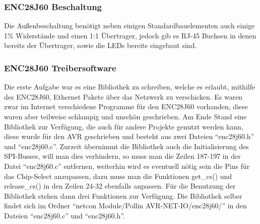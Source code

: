\documentclass[a4paper,14pt,headsepline]{scrartcl}
\begin{document}
\subsubsection{ENC28J60 Beschaltung}
Die Außenbeschaltung benötigt neben einigen Standardbauelementen auch einige 1\% Widerstände und einen 1:1 Übertrager, jedoch gib es RJ-45 Buchsen in denen bereits der Übertrager, sowie die LEDs bereits eingebaut sind.
\begin{figure}[h]
\begin{center}
\end{center}
\end{figure}

\newpage

\subsubsection{ENC28J60 Treibersoftware}
Die erste Aufgabe war es eine Bibliothek zu schreiben, welche es erlaubt, mithilfe des ENC28J60, Ethernet Pakete über das Netzwerk zu verschicken. Es waren zwar im Internet verschiedene Programme für den ENC28J60 vorhanden, diese waren aber teilweise schlampig und unschön geschrieben. Am Ende Stand eine Bibliothek zur Verfügung, die auch für andere Projekte genutzt werden kann, diese wurde für den AVR geschrieben und besteht aus zwei Dateien "`enc28j60.h"' und "`enc28j60.c"'. Zurzeit übernimmt die Bibliothek auch die Initialisierung des SPI-Busses, will man dies verhindern, so muss man die Zeilen 187-197 in der Datei "`enc28j60.c"' entfernen, weiterhin wird es eventuell nötig sein die  Pins für das Chip-Select anzupassen, dazu muss man die Funktionen get\_cs() und release\_cs() in den Zeilen 24-32 ebenfalls anpassen. Für die Benutzung der Bibliothek stehen dann drei Funktionen zur Verfügung. Die Bibliothek selber findet sich im Ordner "`netcon Module/Pollin AVR-NET-IO/enc28j60/"' in den Dateien "`enc28j60.c"' und "`enc28j60.h"'.
\end{document}
